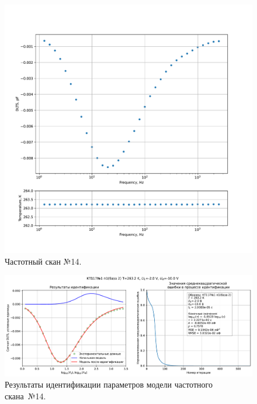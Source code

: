 \begin{figure}[!ht]
    \centering
    \includegraphics[width=1\textwidth]{../plots/КТ117№1_п1(база 2)_2500Гц-1Гц_1пФ_-10С_-2В-10В_100мВ_20мкс_шаг_0,1.pdf}
    \caption{Частотный скан №14.}
    \label{pic:frequency_scan_14}
\end{figure}

\begin{figure}[!ht]
    \centering
    \includegraphics[width=1\textwidth]{../plots/КТ117№1_п1(база 2)_2500Гц-1Гц_1пФ_-10С_-2В-10В_100мВ_20мкс_шаг_0,1_model.pdf}
    \caption{Результаты идентификации параметров модели частотного скана~№14.}
    \label{pic:frequency_scan_model14}
\end{figure}

\pagebreak


